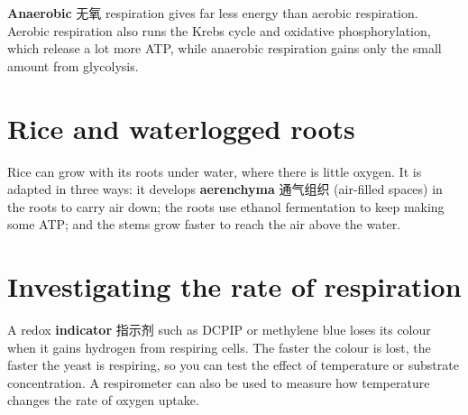 \documentclass[11pt]{article}
\begin{document}
\textbf{Anaerobic} 无氧 respiration gives far less energy than aerobic respiration. Aerobic respiration also runs the Krebs cycle and oxidative phosphorylation, which release a lot more ATP, while anaerobic respiration gains only the small amount from glycolysis.

\section*{Rice and waterlogged roots}

Rice can grow with its roots under water, where there is little oxygen. It is adapted in three ways: it develops \textbf{aerenchyma} 通气组织 (air-filled spaces) in the roots to carry air down; the roots use ethanol fermentation to keep making some ATP; and the stems grow faster to reach the air above the water.

\section*{Investigating the rate of respiration}

A redox \textbf{indicator} 指示剂 such as DCPIP or methylene blue loses its colour when it gains hydrogen from respiring cells. The faster the colour is lost, the faster the yeast is respiring, so you can test the effect of temperature or substrate concentration. A respirometer can also be used to measure how temperature changes the rate of oxygen uptake.
\end{document}
